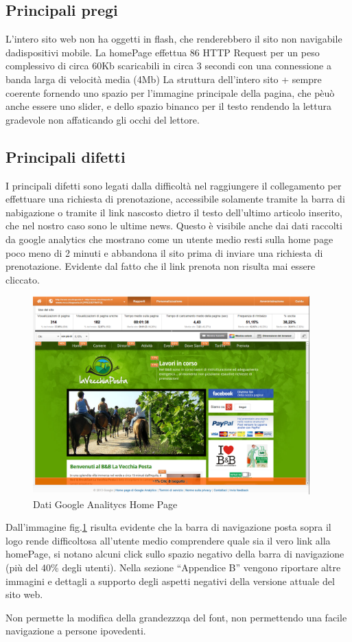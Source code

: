 \documentclass[a4paper,12pt,hidelinks]{report}
\begin{document}
\subsection{Principali pregi}
L'intero sito web non ha oggetti in flash, che renderebbero il sito non navigabile dadispositivi mobile.
La homePage effettua 86 HTTP Request per un peso complessivo di circa 60Kb scaricabili in circa 3 secondi con una connessione a banda larga di velocità media (4Mb)
La struttura dell'intero sito + sempre coerente fornendo uno spazio per l'immagine principale della pagina, che pèuò anche essere uno slider, e dello spazio binanco per il testo rendendo la lettura gradevole
non affaticando gli occhi del lettore.
\subsection{Principali difetti}
I principali difetti sono legati dalla difficoltà nel raggiungere il collegamento per effettuare una richiesta di prenotazione, accessibile solamente tramite la barra di nabigazione o
tramite il link nascosto dietro il testo dell'ultimo articolo inserito, che nel nostro caso sono le ultime news. Questo è visibile anche dai dati raccolti da google analytics che mostrano come un utente medio
resti sulla home page poco meno di 2 minuti e abbandona il sito prima di inviare una richiesta di prenotazione. Evidente dal fatto che il link prenota non risulta mai essere cliccato.

\begin{figure}[h!]%
	\includegraphics[width=0.95\textwidth,keepaspectratio=true]{img/googleAnalyticsDoc1}
	\centering
	\caption{Dati Google Analitycs Home Page}%
	\label{fig:googleHomePage}%
\end{figure}
Dall'immagine fig.\ref{fig:googleHomePage} risulta evidente che la barra di navigazione posta sopra il logo rende difficoltosa all'utente medio comprendere quale sia il vero link alla homePage, si notano alcuni click sullo spazio negativo della
barra di navigazione (più del 40\% degli utenti). Nella sezione ``Appendice B'' vengono riportare altre immagini e dettagli a supporto degli aspetti negativi della versione attuale 
del sito web.
\par Non permette la modifica della grandezzzqa del font, non permettendo una facile navigazione a persone ipovedenti.
\end{document}
